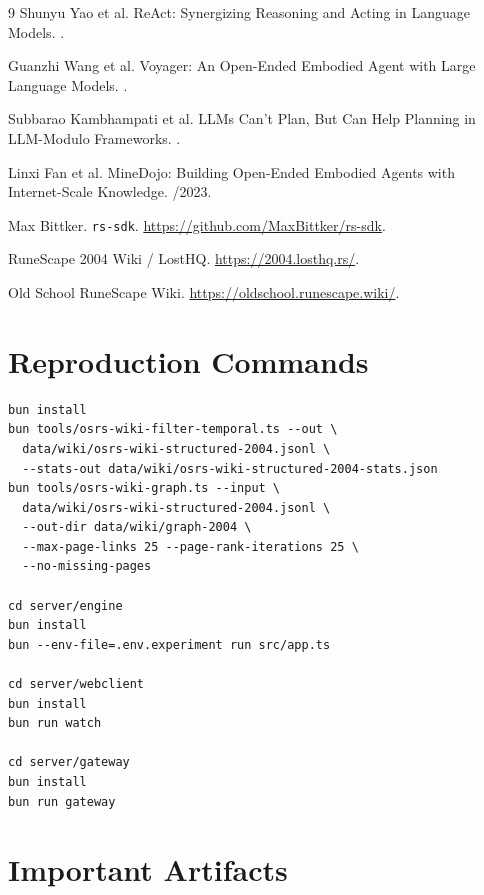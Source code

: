 \documentclass[10pt,twocolumn,letterpaper]{article}
\begin{document}
\begin{thebibliography}{9}
Shunyu Yao et al.
\newblock ReAct: Synergizing Reasoning and Acting in Language Models.
.

Guanzhi Wang et al.
\newblock Voyager: An Open-Ended Embodied Agent with Large Language Models.
.

Subbarao Kambhampati et al.
\newblock LLMs Can't Plan, But Can Help Planning in LLM-Modulo Frameworks.
.

Linxi Fan et al.
\newblock MineDojo: Building Open-Ended Embodied Agents with Internet-Scale Knowledge.
/2023.

Max Bittker.
\newblock \texttt{rs-sdk}.
\newblock \url{https://github.com/MaxBittker/rs-sdk}.

RuneScape 2004 Wiki / LostHQ.
\newblock \url{https://2004.losthq.rs/}.

Old School RuneScape Wiki.
\newblock \url{https://oldschool.runescape.wiki/}.
\end{thebibliography}

\clearpage
\appendix

\section{Reproduction Commands}

\begin{verbatim}
bun install
bun tools/osrs-wiki-filter-temporal.ts --out \
  data/wiki/osrs-wiki-structured-2004.jsonl \
  --stats-out data/wiki/osrs-wiki-structured-2004-stats.json
bun tools/osrs-wiki-graph.ts --input \
  data/wiki/osrs-wiki-structured-2004.jsonl \
  --out-dir data/wiki/graph-2004 \
  --max-page-links 25 --page-rank-iterations 25 \
  --no-missing-pages

cd server/engine
bun install
bun --env-file=.env.experiment run src/app.ts

cd server/webclient
bun install
bun run watch

cd server/gateway
bun install
bun run gateway
\end{verbatim}

\section{Important Artifacts}
\end{document}
